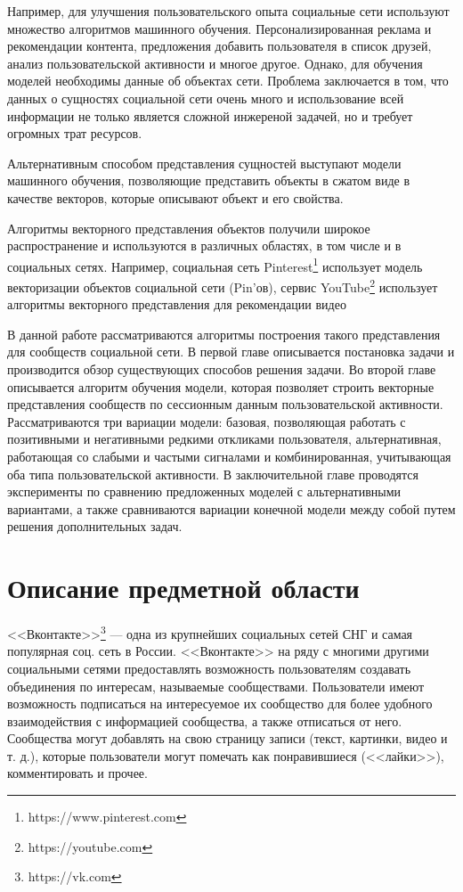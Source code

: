 \documentclass[times,specification,annotation]{itmo-student-thesis}
\begin{document}
Например, для улучшения пользовательского опыта социальные сети используют множество алгоритмов машинного обучения. Персонализированная реклама и рекомендации контента, предложения добавить пользователя в список друзей, анализ пользовательской активности и многое другое. Однако, для обучения моделей необходимы данные об объектах сети. Проблема заключается в том, что данных о сущностях социальной сети очень много и использование всей информации не только является сложной инжереной задачей, но и требует огромных трат ресурсов.   

Альтернативным способом представления сущностей выступают модели машинного обучения, позволяющие представить объекты в сжатом виде в качестве векторов, которые описывают объект и его свойства.

Алгоритмы векторного представления объектов получили широкое распространение и используются в различных областях, в том числе и в социальных сетях. Например, социальная сеть Pinterest\footnote{https://www.pinterest.com} \cite{Liu2017} использует модель векторизации объектов социальной сети (Pin'ов), сервис YouTube\footnote{https://youtube.com} использует алгоритмы векторного представления для рекомендации видео\cite{Covington2016} 

В данной работе рассматриваются алгоритмы построения такого представления для сообществ социальной сети. В первой главе описывается постановка задачи и производится обзор существующих способов решения задачи. Во второй главе описывается алгоритм обучения модели, которая позволяет строить векторные представления сообществ по сессионным данным пользовательской активности. Рассматриваются три вариации модели: базовая, позволяющая работать с позитивными и негативными редкими откликами пользователя, альтернативная, работающая со слабыми и частыми сигналами и комбинированная, учитывающая оба типа пользовательской активности. В заключительной главе проводятся эксперименты по сравнению предложенных моделей с альтернативными вариантами, а также сравниваются вариации конечной модели между собой путем решения дополнительных задач. 

\chapter{Описание предметной области}

<<Вконтакте>>\footnote{https://vk.com} --- одна из крупнейших социальных сетей СНГ и самая
популярная соц. сеть в России. <<Вконтакте>> на ряду с многими другими
социальными сетями предоставлять возможность пользователям создавать объединения по интересам,
называемые сообществами. Пользователи имеют возможность подписаться на
интересуемое их сообщество для более удобного взаимодействия с информацией
сообщества, а также отписаться от него. Сообщества могут добавлять на свою
страницу записи (текст, картинки, видео и т. д.), которые пользователи могут
помечать как понравившиеся (<<лайки>>), комментировать и прочее.
\end{document}
